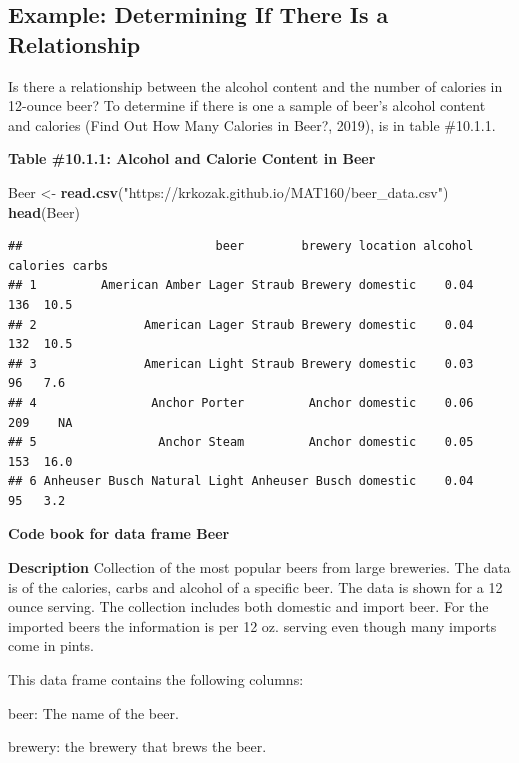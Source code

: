 \documentclass[
]{book}
\newenvironment{Shaded}{\begin{snugshade}}{\end{snugshade}}
\newcommand{\KeywordTok}[1]{\textcolor[rgb]{0.13,0.29,0.53}{\textbf{#1}}}
\newcommand{\NormalTok}[1]{#1}
\newcommand{\StringTok}[1]{\textcolor[rgb]{0.31,0.60,0.02}{#1}}
\begin{document}
\hypertarget{example-determining-if-there-is-a-relationship}{%
\subsection{Example: Determining If There Is a Relationship}\label{example-determining-if-there-is-a-relationship}}

Is there a relationship between the alcohol content and the number of calories in 12-ounce beer? To determine if there is one a sample of beer's alcohol content and calories (Find Out How Many Calories in Beer?, 2019), is in table \#10.1.1.

\textbf{Table \#10.1.1: Alcohol and Calorie Content in Beer}

\begin{Shaded}
\begin{Highlighting}[]
\NormalTok{Beer <-}\StringTok{ }\KeywordTok{read.csv}\NormalTok{(}\StringTok{"https://krkozak.github.io/MAT160/beer_data.csv"}\NormalTok{)}
\KeywordTok{head}\NormalTok{(Beer)}
\end{Highlighting}
\end{Shaded}

\begin{verbatim}
##                           beer        brewery location alcohol calories carbs
## 1         American Amber Lager Straub Brewery domestic    0.04      136  10.5
## 2               American Lager Straub Brewery domestic    0.04      132  10.5
## 3               American Light Straub Brewery domestic    0.03       96   7.6
## 4                Anchor Porter         Anchor domestic    0.06      209    NA
## 5                 Anchor Steam         Anchor domestic    0.05      153  16.0
## 6 Anheuser Busch Natural Light Anheuser Busch domestic    0.04       95   3.2
\end{verbatim}

\textbf{Code book for data frame Beer}

\textbf{Description}
Collection of the most popular beers from large breweries. The data is of the calories, carbs and alcohol of a specific beer. The data is shown for a 12 ounce serving. The collection includes both domestic and import beer. For the imported beers the information is per 12 oz. serving even though many imports come in pints.

This data frame contains the following columns:

beer: The name of the beer.

brewery: the brewery that brews the beer.
\end{document}
